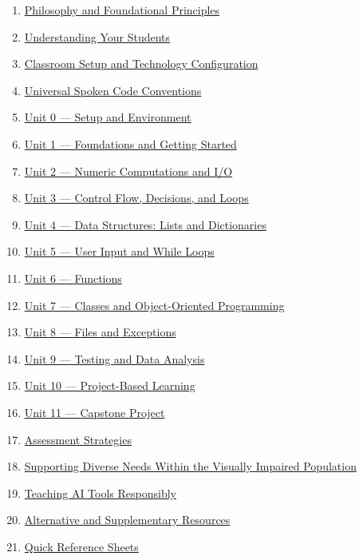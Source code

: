 \documentclass[
  justified,
  openright,
]{tufte-book}
\providecommand{\tightlist}{%
  \setlength{\itemsep}{0pt}\setlength{\parskip}{0pt}}
\begin{document}
\begin{enumerate}
\def\labelenumi{\arabic{enumi}.}
\tightlist
\item
  \hyperref[philosophy-and-foundational-principles]{Philosophy and
  Foundational Principles}
\item
  \hyperref[understanding-your-students]{Understanding Your Students}
\item
  \hyperref[classroom-setup-and-technology-configuration]{Classroom
  Setup and Technology Configuration}
\item
  \hyperref[universal-spoken-code-conventions]{Universal Spoken Code
  Conventions}
\item
  \hyperref[unit-0-setup-and-environment]{Unit 0 --- Setup and
  Environment}
\item
  \hyperref[unit-1-foundations-and-getting-started]{Unit 1 ---
  Foundations and Getting Started}
\item
  \hyperref[unit-2-numeric-computations-and-io]{Unit 2 --- Numeric
  Computations and I/O}
\item
  \hyperref[unit-3-control-flow-decisions-and-loops]{Unit 3 --- Control
  Flow, Decisions, and Loops}
\item
  \hyperref[unit-4-data-structures-lists-and-dictionaries]{Unit 4 ---
  Data Structures: Lists and Dictionaries}
\item
  \hyperref[unit-5-user-input-and-while-loops]{Unit 5 --- User Input and
  While Loops}
\item
  \hyperref[unit-6-functions]{Unit 6 --- Functions}
\item
  \hyperref[unit-7-classes-and-object-oriented-programming]{Unit 7 ---
  Classes and Object-Oriented Programming}
\item
  \hyperref[unit-8-files-and-exceptions]{Unit 8 --- Files and
  Exceptions}
\item
  \hyperref[unit-9-testing-and-data-analysis]{Unit 9 --- Testing and
  Data Analysis}
\item
  \hyperref[unit-10-project-based-learning]{Unit 10 --- Project-Based
  Learning}
\item
  \hyperref[unit-11-capstone-project]{Unit 11 --- Capstone Project}
\item
  \hyperref[assessment-strategies]{Assessment Strategies}
\item
  \hyperref[supporting-diverse-needs-within-the-visually-impaired-population]{Supporting
  Diverse Needs Within the Visually Impaired Population}
\item
  \hyperref[teaching-ai-tools-responsibly]{Teaching AI Tools
  Responsibly}
\item
  \hyperref[alternative-and-supplementary-resources]{Alternative and
  Supplementary Resources}
\item
  \hyperref[quick-reference-sheets]{Quick Reference Sheets}
\end{enumerate}
\end{document}
